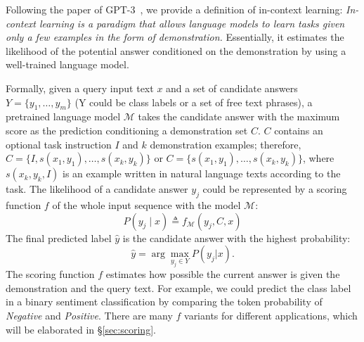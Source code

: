 
Following the paper of GPT-3~\cite{gpt3}, we provide a definition of in-context learning:
\textsl{In-context learning is a paradigm that allows language models to learn tasks given only a few examples in the form of demonstration.
}
Essentially, it estimates the likelihood of the potential answer conditioned on the demonstration by using a well-trained language model. 


Formally, given a query input text $x$ and a set of candidate answers $Y = \{y_1, \ldots, y_m\}$ (Y could be class labels or a set of free text phrases), a pretrained language model $\mathcal{M}$ takes the candidate answer with the maximum score as the prediction conditioning a demonstration set $C$. $C$ contains an optional task instruction $I$ and $k$ demonstration examples; therefore, $C = \{ I, s(x_1, y_1), \ldots, s(x_k, y_k) \}$ or $C = \{ s(x_1, y_1), \ldots, s(x_k, y_k) \}$, where $s(x_k, y_k,I)$ is an example written in natural language texts according to the task.
The likelihood of a candidate answer $y_j$ could be represented by a scoring function $f$ of the whole input sequence with the model $\mathcal{M}$:
\begin{equation}
    P( y_j \mid x) \triangleq
    f_\mathcal{M} ( y_j,  C, x)
\end{equation}
The final predicted label $\hat y$ is the candidate answer with the highest probability:
\begin{equation}
    \hat y = \arg\max_{y_j \in Y } P(y_j | x). 
\end{equation}
The scoring function $f$ estimates how possible the current answer is given the demonstration and the query text. For example, we could predict the class label in a binary sentiment classification by comparing the token probability of \emph{Negative} and \emph{Positive}. There are many $f$ variants for different applications, which will be elaborated in \S\ref{sec:scoring}. 

